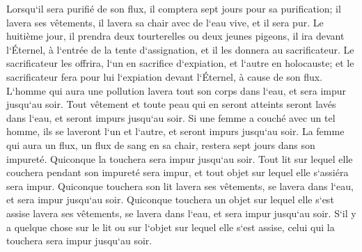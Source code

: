 \verse Lorsqu`il sera purifié de son flux, il comptera sept jours pour sa purification; il lavera ses vêtements, il lavera sa chair avec de l`eau vive, et il sera pur. 
\verse Le huitième jour, il prendra deux tourterelles ou deux jeunes pigeons, il ira devant l`Éternel, à l`entrée de la tente d`assignation, et il les donnera au sacrificateur. 
\verse Le sacrificateur les offrira, l`un en sacrifice d`expiation, et l`autre en holocauste; et le sacrificateur fera pour lui l`expiation devant l`Éternel, à cause de son flux. 
\verse L`homme qui aura une pollution lavera tout son corps dans l`eau, et sera impur jusqu`au soir. 
\verse Tout vêtement et toute peau qui en seront atteints seront lavés dans l`eau, et seront impurs jusqu`au soir. 
\verse Si une femme a couché avec un tel homme, ils se laveront l`un et l`autre, et seront impurs jusqu`au soir. 
\verse La femme qui aura un flux, un flux de sang en sa chair, restera sept jours dans son impureté. Quiconque la touchera sera impur jusqu`au soir. 
\verse Tout lit sur lequel elle couchera pendant son impureté sera impur, et tout objet sur lequel elle s`assiéra sera impur. 
\verse Quiconque touchera son lit lavera ses vêtements, se lavera dans l`eau, et sera impur jusqu`au soir. 
\verse Quiconque touchera un objet sur lequel elle s`est assise lavera ses vêtements, se lavera dans l`eau, et sera impur jusqu`au soir. 
\verse S`il y a quelque chose sur le lit ou sur l`objet sur lequel elle s`est assise, celui qui la touchera sera impur jusqu`au soir. 
